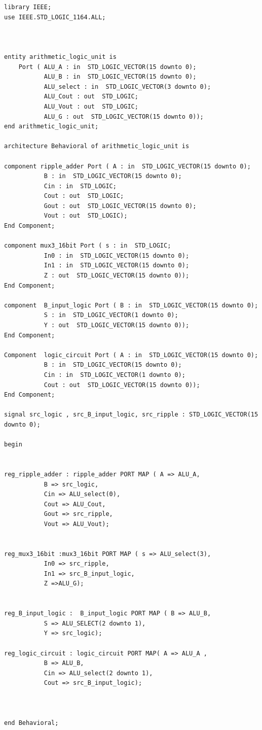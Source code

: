 \documentclass{article}
\begin{document}
\begin{lstlisting}
library IEEE;
use IEEE.STD_LOGIC_1164.ALL;



entity arithmetic_logic_unit is
    Port ( ALU_A : in  STD_LOGIC_VECTOR(15 downto 0);
           ALU_B : in  STD_LOGIC_VECTOR(15 downto 0);
           ALU_select : in  STD_LOGIC_VECTOR(3 downto 0);
           ALU_Cout : out  STD_LOGIC;
           ALU_Vout : out  STD_LOGIC;
           ALU_G : out  STD_LOGIC_VECTOR(15 downto 0));
end arithmetic_logic_unit;

architecture Behavioral of arithmetic_logic_unit is

component ripple_adder Port ( A : in  STD_LOGIC_VECTOR(15 downto 0);
           B : in  STD_LOGIC_VECTOR(15 downto 0);
           Cin : in  STD_LOGIC;
           Cout : out  STD_LOGIC;
           Gout : out  STD_LOGIC_VECTOR(15 downto 0);
           Vout : out  STD_LOGIC);
End Component;

component mux3_16bit Port ( s : in  STD_LOGIC;
           In0 : in  STD_LOGIC_VECTOR(15 downto 0);
           In1 : in  STD_LOGIC_VECTOR(15 downto 0);
           Z : out  STD_LOGIC_VECTOR(15 downto 0));
End Component;

component  B_input_logic Port ( B : in  STD_LOGIC_VECTOR(15 downto 0);
           S : in  STD_LOGIC_VECTOR(1 downto 0);
           Y : out  STD_LOGIC_VECTOR(15 downto 0));
End Component;

Component  logic_circuit Port ( A : in  STD_LOGIC_VECTOR(15 downto 0);
           B : in  STD_LOGIC_VECTOR(15 downto 0);
           Cin : in  STD_LOGIC_VECTOR(1 downto 0);
           Cout : out  STD_LOGIC_VECTOR(15 downto 0));
End Component;

signal src_logic , src_B_input_logic, src_ripple : STD_LOGIC_VECTOR(15 downto 0);

begin


reg_ripple_adder : ripple_adder PORT MAP ( A => ALU_A,
           B => src_logic,
           Cin => ALU_select(0),
           Cout => ALU_Cout,
           Gout => src_ripple,
           Vout => ALU_Vout);


reg_mux3_16bit :mux3_16bit PORT MAP ( s => ALU_select(3),
           In0 => src_ripple,
           In1 => src_B_input_logic,
           Z =>ALU_G);


reg_B_input_logic :  B_input_logic PORT MAP ( B => ALU_B,
           S => ALU_SELECT(2 downto 1),
           Y => src_logic);

reg_logic_circuit : logic_circuit PORT MAP( A => ALU_A ,
           B => ALU_B,
           Cin => ALU_select(2 downto 1),
           Cout => src_B_input_logic);



end Behavioral;
\end{lstlisting}
\end{document}
